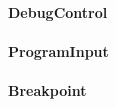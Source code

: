 \documentclass[parskip=full]{scrartcl}
\begin{document}
\paragraph{DebugControl}
\paragraph{ProgramInput}
\paragraph{Breakpoint}
\end{document}
